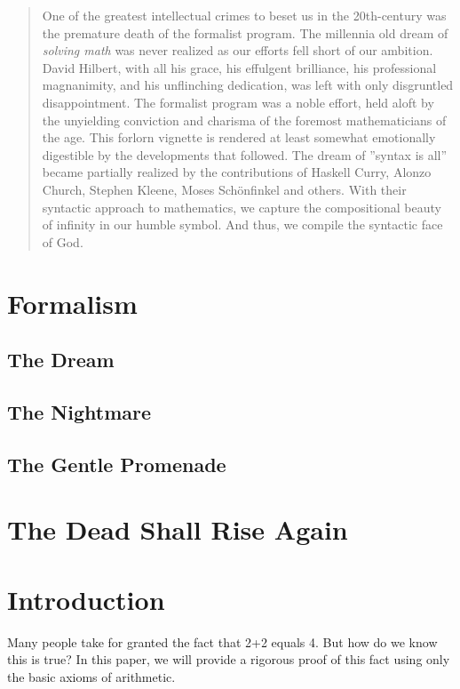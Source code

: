 \maketitle
\pagebreak

\begin{abstract}
    One of the greatest intellectual crimes to beset us in the 20th-century was
    the premature death of the formalist program. The millennia old dream of
    \textit{solving math} was never realized as our efforts fell short of our
    ambition. David Hilbert, with all his grace, his effulgent brilliance, his
    professional magnanimity, and his unflinching dedication, was left with only
    disgruntled disappointment. The formalist program was a noble effort, held
    aloft by the unyielding conviction and charisma of the foremost
    mathematicians of the age. This forlorn vignette is rendered at least
    somewhat emotionally digestible by the developments that followed. The dream
    of ''syntax is all'' became partially realized by the contributions of Haskell
    Curry, Alonzo Church, Stephen Kleene, Moses Schönfinkel and others. With
    their syntactic approach to mathematics, we capture the compositional beauty
    of infinity in our humble symbol. And thus, we compile the syntactic face of God.
\end{abstract}
\pagebreak
\tableofcontents
\pagebreak

\section{Formalism}
\subsection{The Dream}
\subsection{The Nightmare}
\subsection{The Gentle Promenade}

\section{The Dead Shall Rise Again}

\section{Introduction}
Many people take for granted the fact that 2+2 equals 4. But how do we know
this is true? In this paper, we will provide a rigorous proof of this fact
using only the basic axioms of arithmetic.

